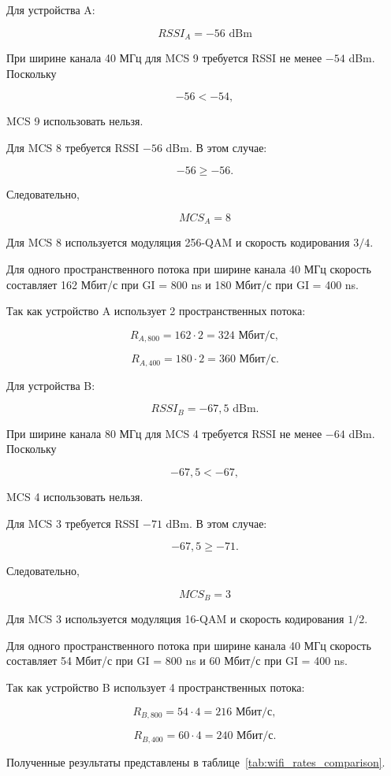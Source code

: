 Для устройства A:

\[
RSSI_A=-56\text{ dBm}
\]

При ширине канала 40 МГц для MCS 9 требуется RSSI не менее
$-54$ dBm. Поскольку

\[
-56 < -54,
\]

MCS 9 использовать нельзя.

Для MCS 8 требуется RSSI $-56$ dBm. В этом случае:

\[
-56 \geq -56.
\]

Следовательно,

\[
\boxed{MCS_A=8}
\]

Для MCS 8 используется модуляция 256-QAM и скорость кодирования
$3/4$.

Для одного пространственного потока при ширине канала 40 МГц
скорость составляет 162 Мбит/с при GI = 800 ns и 180 Мбит/с
при GI = 400 ns.

Так как устройство A использует 2 пространственных потока:

\[
R_{A,800}=162\cdot2=324\text{ Мбит/с},
\]

\[
R_{A,400}=180\cdot2=360\text{ Мбит/с}.
\]

Для устройства B:

\[
RSSI_B=-67{,}5\text{ dBm}.
\]

При ширине канала 80 МГц для MCS 4 требуется RSSI не менее
$-64$ dBm. Поскольку

\[
-67{,}5 < -67,
\]

MCS 4 использовать нельзя.

Для MCS 3 требуется RSSI $-71$ dBm. В этом случае:

\[
-67{,}5 \geq -71.
\]

Следовательно,

\[
\boxed{MCS_B=3}
\]

Для MCS 3 используется модуляция 16-QAM и скорость кодирования
$1/2$.

Для одного пространственного потока при ширине канала 40 МГц
скорость составляет 54 Мбит/с при GI = 800 ns и 60 Мбит/с
при GI = 400 ns.

Так как устройство B использует 4 пространственных потока:

\[
R_{B,800}=54\cdot4=216\text{ Мбит/с},
\]

\[
R_{B,400}=60\cdot4=240\text{ Мбит/с}.
\]

Полученные результаты представлены в таблице~\ref{tab:wifi_rates_comparison}.

